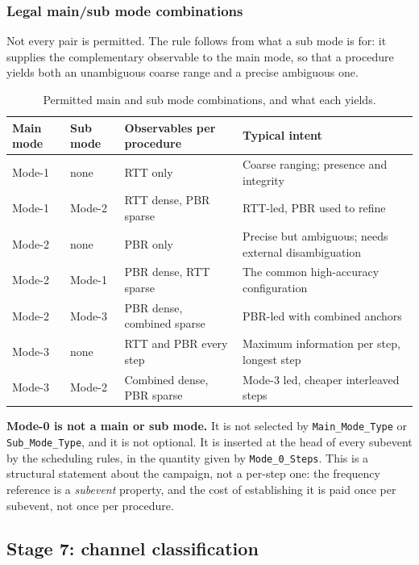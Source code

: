 \documentclass[11pt,a4paper]{article}
\newcommand{\code}[1]{\texttt{\small #1}}
\begin{document}
\subsubsection{Legal main/sub mode combinations}

Not every pair is permitted. The rule follows from what a sub mode is for: it supplies the
complementary observable to the main mode, so that a procedure yields both an unambiguous coarse
range and a precise ambiguous one.

\begin{table}[h]
\caption{Permitted main and sub mode combinations, and what each yields.}
\label{tab:modecombo}
\centering\small
\begin{tabular}{@{}L{22mm}L{22mm}L{40mm}L{48mm}@{}}
\toprule
Main mode & Sub mode & Observables per procedure & Typical intent \\
\midrule
Mode-1 & none   & RTT only & Coarse ranging; presence and integrity \\
Mode-1 & Mode-2 & RTT dense, PBR sparse & RTT-led, PBR used to refine \\
Mode-2 & none   & PBR only & Precise but ambiguous; needs external disambiguation \\
Mode-2 & Mode-1 & PBR dense, RTT sparse & The common high-accuracy configuration \\
Mode-2 & Mode-3 & PBR dense, combined sparse & PBR-led with combined anchors \\
Mode-3 & none   & RTT and PBR every step & Maximum information per step, longest step \\
Mode-3 & Mode-2 & Combined dense, PBR sparse & Mode-3 led, cheaper interleaved steps \\
\bottomrule
\end{tabular}
\end{table}

\begin{callout}
\textbf{Mode-0 is not a main or sub mode.} It is not selected by \code{Main\_Mode\_Type} or
\code{Sub\_Mode\_Type}, and it is not optional. It is inserted at the head of every subevent by the
scheduling rules, in the quantity given by \code{Mode\_0\_Steps}. This is a structural statement about
the campaign, not a per-step one: the frequency reference is a \emph{subevent} property, and the cost
of establishing it is paid once per subevent, not once per procedure.
\end{callout}

\subsection{Stage 7: channel classification}
\end{document}
